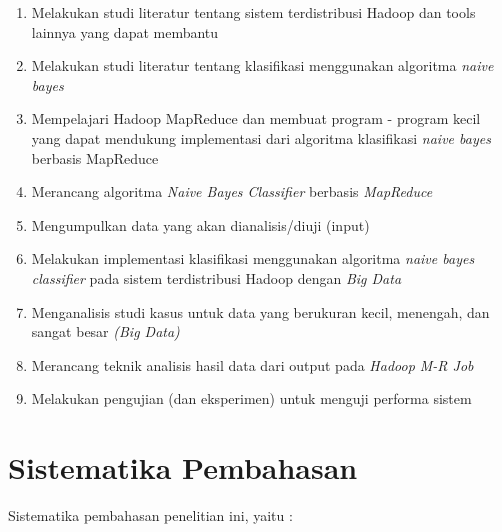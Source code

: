 \begin{enumerate}
	\item Melakukan studi literatur tentang sistem terdistribusi Hadoop dan tools lainnya yang dapat membantu
		\item Melakukan studi literatur tentang klasifikasi menggunakan algoritma \textit{naive bayes}
		\item Mempelajari Hadoop MapReduce dan membuat program - program kecil yang dapat mendukung implementasi dari algoritma klasifikasi \textit{naive bayes} berbasis MapReduce
		\item Merancang algoritma \textit{Naive Bayes Classifier} berbasis \textit{MapReduce} 
		\item Mengumpulkan data yang akan dianalisis/diuji (input)
		\item Melakukan implementasi klasifikasi menggunakan algoritma \textit{naive bayes classifier} pada sistem terdistribusi Hadoop dengan \textit{Big Data}
		\item Menganalisis studi kasus untuk data yang berukuran kecil, menengah, dan sangat besar \textit{(Big Data)}
		\item Merancang teknik analisis hasil data dari output pada {\it Hadoop M-R Job}
		\item Melakukan pengujian (dan eksperimen) untuk menguji performa sistem
\end{enumerate}


\section{Sistematika Pembahasan}

Sistematika pembahasan penelitian ini, yaitu :

